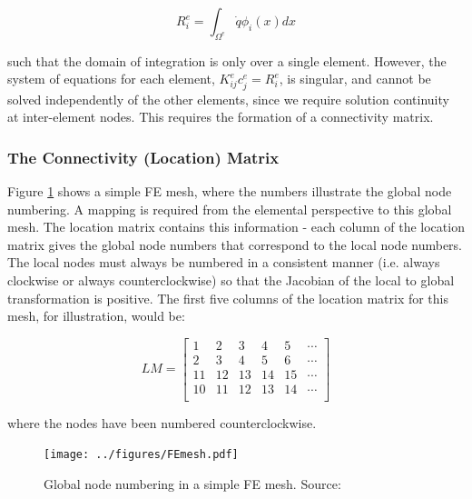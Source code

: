 \documentclass[10pt]{article}
\newcommand{\beq}{\begin{equation}}
\newcommand{\eeq}{\end{equation}}
\begin{document}
\beq
R_{i}^e=\int_{\Omega^e}\dot{q}\phi_i(x)dx
\eeq

such that the domain of integration is only over a single element. However, the system of equations for each element, \(K_{ij}^ec_j^e=R_i^e\), is singular, and cannot be solved independently of the other elements, since we require solution continuity at inter-element nodes. This requires the formation of a connectivity matrix.

\subsubsection{The Connectivity (Location) Matrix}
Figure \ref{fig:FEmesh} shows a simple FE mesh, where the numbers illustrate the global node numbering. A mapping is required from the elemental perspective to this global mesh. The location matrix contains this information - each column of the location matrix gives the global node numbers that correspond to the local node numbers. The local nodes must always be numbered in a consistent manner (i.e. always clockwise or always counterclockwise) so that the Jacobian of the local to global transformation is positive. The first five columns of the location matrix for this mesh, for illustration, would be:

\beq
\label{eq:LM}
LM=\begin{bmatrix}
1 & 2 & 3 & 4 & 5 & \cdots\\
2 & 3 & 4 & 5 & 6 & \cdots\\
11 & 12 & 13 & 14 & 15 & \cdots\\
10 & 11 & 12 & 13 & 14 & \cdots\\
\end{bmatrix}
\eeq

where the nodes have been numbered counterclockwise.

\begin{figure}[H]
\centering
\texttt{[image: ../figures/FEmesh.pdf]}
\caption{Global node numbering in a simple FE mesh. Source:}
\label{fig:FEmesh}
\end{figure}
\end{document}
